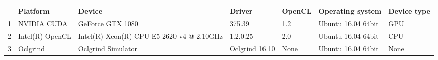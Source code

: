 \begin{tabular}{lllllll}
\toprule
{} &         Platform &                                     Device &          Driver & OpenCL &    Operating system & Device type \\
\midrule
1 &      NVIDIA CUDA &                           GeForce GTX 1080 &          375.39 &    1.2 &  Ubuntu 16.04 64bit &         GPU \\
2 &  Intel(R) OpenCL &  Intel(R) Xeon(R) CPU E5-2620 v4 @ 2.10GHz &        1.2.0.25 &    2.0 &  Ubuntu 16.04 64bit &         CPU \\
3 &         Oclgrind &                         Oclgrind Simulator &  Oclgrind 16.10 &   None &  Ubuntu 16.04 64bit &        None \\
\bottomrule
\end{tabular}
